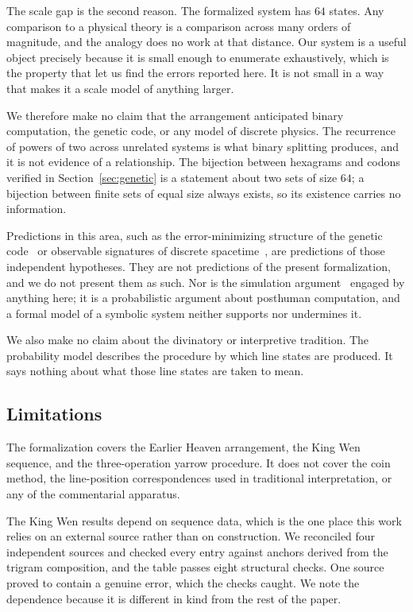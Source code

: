 \documentclass[11pt,a4paper]{article}
\begin{document}
The scale gap is the second reason. The formalized system has $64$ states. Any
comparison to a physical theory is a comparison across many orders of magnitude,
and the analogy does no work at that distance. Our system is a useful object
precisely because it is small enough to enumerate exhaustively, which is the
property that let us find the errors reported here. It is not small in a way that
makes it a scale model of anything larger.

We therefore make no claim that the arrangement anticipated binary computation,
the genetic code, or any model of discrete physics. The recurrence of powers of
two across unrelated systems is what binary splitting produces, and it is not
evidence of a relationship. The bijection between hexagrams and codons verified
in Section~\ref{sec:genetic} is a statement about two sets of size $64$; a
bijection between finite sets of equal size always exists, so its existence
carries no information.

Predictions in this area, such as the error-minimizing structure of the genetic
code~\cite{freeland1998genetic} or observable signatures of discrete
spacetime~\cite{mattingly2005modern}, are predictions of those independent
hypotheses. They are not predictions of the present formalization, and we do not
present them as such. Nor is the simulation argument~\cite{bostrom2003simulation}
engaged by anything here; it is a probabilistic argument about posthuman
computation, and a formal model of a symbolic system neither supports nor
undermines it.

We also make no claim about the divinatory or interpretive tradition. The
probability model describes the procedure by which line states are produced. It
says nothing about what those line states are taken to mean.

\subsection{Limitations}

The formalization covers the Earlier Heaven arrangement, the King Wen sequence,
and the three-operation yarrow procedure. It does not cover the coin method, the
line-position correspondences used in traditional interpretation, or any of the
commentarial apparatus.

The King Wen results depend on sequence data, which is the one place this work
relies on an external source rather than on construction. We reconciled four
independent sources and checked every entry against anchors derived from the
trigram composition, and the table passes eight structural checks. One source
proved to contain a genuine error, which the checks caught. We note the
dependence because it is different in kind from the rest of the paper.
\end{document}
